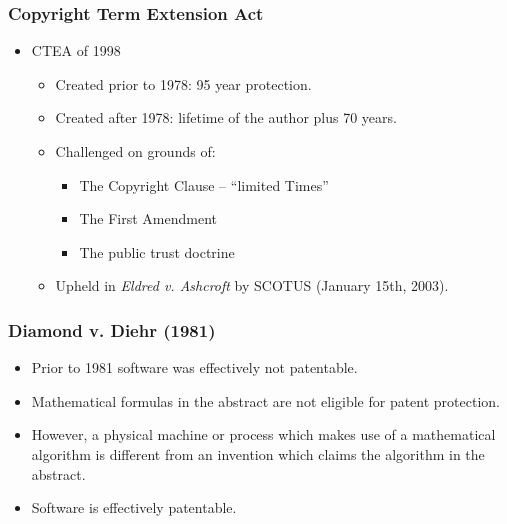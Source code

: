 \documentclass{beamer}
\begin{document}
\begin{frame}[t]
    \frametitle{Copyright Term Extension Act}
  \begin{itemize}
	  \vspace{2mm}
    \item<+-> CTEA of 1998
      \begin{itemize}
		  \vspace{2mm}
        \item<+-> Created prior to 1978: 95 year protection.
		\vspace{2mm}
        \item<+-> Created after 1978: lifetime of the author plus 70 years.
		\vspace{2mm}
        \item<+-> Challenged on grounds of:
        \begin{itemize} %
			\vspace{2mm}
            \item<+-> The Copyright Clause -- ``limited Times''
			\vspace{2mm}
            \item<+-> The First Amendment
			\vspace{2mm}
            \item<+-> The public trust doctrine
        \end{itemize}
		\vspace{2mm}
        \item<+-> Upheld in \emph{Eldred v. Ashcroft} by SCOTUS (January 15th, 2003).
    \end{itemize}
  \end{itemize}
\end{frame}

\begin{frame}[t]
 \frametitle{Diamond v. Diehr (1981)}
 \begin{itemize}
	 \vspace{2mm}
     \item<+-> Prior to 1981 software was effectively not patentable.
	 \vspace{2mm}
     \item<+-> Mathematical formulas in the abstract are not eligible for patent protection.
	 \vspace{2mm}
     \item<+-> However, a physical machine or process which makes use of a mathematical algorithm is different from an invention which claims the algorithm in the abstract.
	 \vspace{2mm}
     \item<+-> Software is effectively patentable.
 \end{itemize}
\end{frame}
\end{document}
